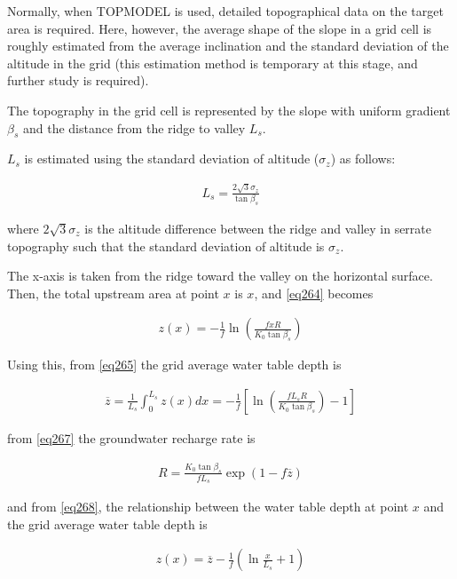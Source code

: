 Normally, when TOPMODEL is used, detailed topographical data on the target area is required. Here, however, the average shape of the slope in a grid cell is roughly estimated from the average
inclination and the standard deviation of the altitude in the grid (this estimation method is temporary at this stage, and further study is required).

The topography in the grid cell is represented by the slope with uniform gradient \(\beta_s\) and the distance from the ridge to valley \(L_s\).

\(L_s\) is estimated using the standard deviation of altitude (\(\sigma_z\)) as follows:

\begin{eqnarray}
L_s = \frac{2\sqrt{3} \sigma_z}{\tan\beta_s}
\label{eq269}
\end{eqnarray}

where \(2\sqrt{3}\sigma_z\) is the altitude difference between the ridge and valley in serrate topography such that the standard deviation of altitude is \(\sigma_z\).

The x-axis is taken from the ridge toward the valley on the horizontal surface. Then, the total upstream area at point \(x\) is \(x\), and \ref{eq264} becomes

\begin{eqnarray}
z(x) = - \frac{1}{f} \ln \left( \frac{fxR}{K_0 \tan \beta_s}\right)
\label{eq270}
\end{eqnarray}

Using this, from \ref{eq265} the grid average water table depth is

\begin{eqnarray}
\overline{z} = \frac 1{L_s}\int_0^{L_s} z(x) dx
 = - \frac1{f}\left[
 \ln \left( \frac{f L_s R}{K_0 \tan\beta_s}\right) -1
\right]
\label{eq271}
\end{eqnarray}

from \ref{eq267} the groundwater recharge rate is

\begin{eqnarray}
R = \frac{K_0 \tan\beta_s}{f L_s}\exp(1-f \overline{z}) \label{eq272}
\end{eqnarray}

and from \ref{eq268}, the relationship between the water table depth at point \(x\) and the grid average water table depth is

\begin{eqnarray}
z(x) = \overline{z} - \frac{1}{f}\left(
\ln \frac{x}{L_s} + 1
\right)
\label{eq273}
\end{eqnarray}

